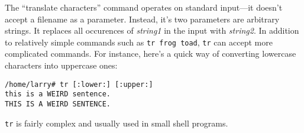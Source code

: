 The ``translate characters'' command operates on standard input---it
doesn't accept a filename as a parameter.  Instead, it's two
parameters are arbitrary strings.  It replaces all occurences of {\sl
  string1} in the input with {\sl string2}.  In addition to relatively
simple commands such as {\tt tr frog toad}, {\tt tr} can accept more
complicated commands.  For instance, here's a quick way of converting
lowercase characters into uppercase ones:

\begin{screen}\begin{verbatim}
/home/larry# tr [:lower:] [:upper:]
this is a WEIRD sentence.
THIS IS A WEIRD SENTENCE.
\end{verbatim}\end{screen}
  
{\tt tr} is fairly complex and usually used in small shell programs.



